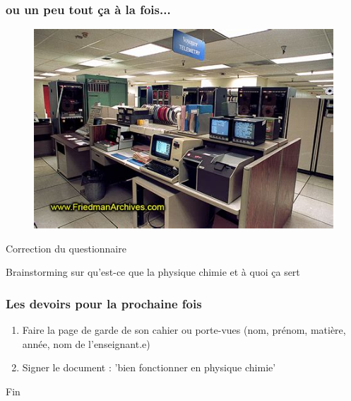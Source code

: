\documentclass{beamer}
\begin{document}
    \begin{frame}
        \frametitle{ou un peu tout ça à la fois...}
        
        \begin{figure}
            \includegraphics[width=0.8\linewidth]{nasa_computer.jpg}
    \end{figure}
    \end{frame}
    

    \begin{frame}
        \begin{center}
            Correction du questionnaire
        \end{center}
    \end{frame}

    \begin{frame}
        \begin{center}
            Brainstorming sur qu'est-ce que la physique chimie et à quoi ça sert
        \end{center}
    \end{frame}


    \begin{frame}
        \frametitle{Les devoirs pour la prochaine fois}
        \begin{enumerate}
            \item Faire la page de garde de son cahier ou porte-vues
            (nom, prénom, matière, année, nom de l'enseignant.e)
            \item Signer le document : 'bien fonctionner en physique chimie' 
        \end{enumerate}
    \end{frame}




\begin{frame}
\Huge{\centerline{Fin}}
\end{frame}

\end{document}
